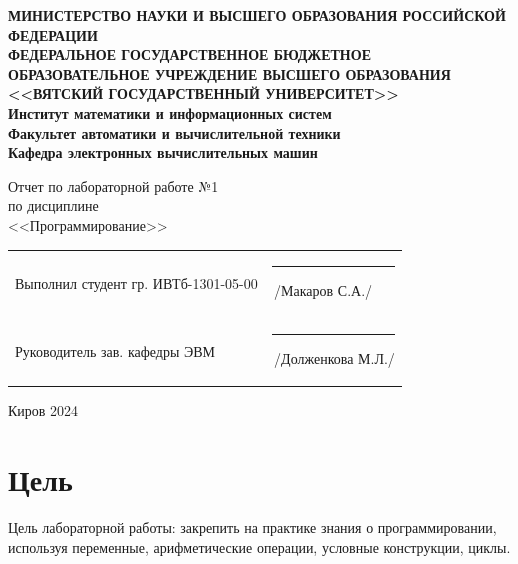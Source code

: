 \documentclass[a4paper,14pt]{extarticle}
\begin{document}
  \newpage\thispagestyle{empty}
  \begin{center}
    \textbf{
      \MakeUppercase{
        Министерство науки и высшего образования Российской Федерации\\
        Федеральное государственное бюджетное образовательное учреждение высшего образования\\
        <<Вятский Государственный Университет>>\\
      }
      Институт математики и информационных систем\\
      Факультет автоматики и вычислительной техники\\
      Кафедра электронных вычислительных машин
    }
  \end{center}
  \vfill

  \begin{center}
    Отчет по лабораторной работе №1\\
    по дисциплине\\
    <<Программирование>>\\
  \end{center}
  \vfill

  \noindent
  \begin{tabular}{ll}
    Выполнил студент гр. ИВТб-1301-05-00 \hspace{8mm} &
    \rule[-1mm]{20mm}{0.10mm}\,/Макаров С.А./\\

    Руководитель зав. кафедры ЭВМ & \rule[-1mm]{20mm}{0.10mm}\,/Долженкова М.Л./\\
  \end{tabular}

  \vfill
  \begin{center}
    Киров 2024
  \end{center}

  \newpage
  \section*{Цель}
  Цель лабораторной работы: закрепить на практике знания о программировании, используя переменные, арифметические операции, условные конструкции, циклы.
\end{document}
